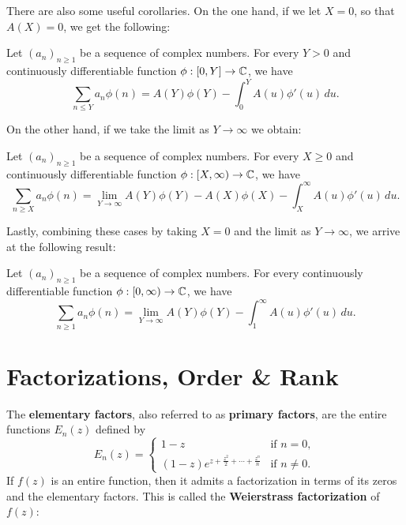     There are also some useful corollaries. On the one hand, if we let $X = 0$, so that $A(X) = 0$, we get the following:

    \begin{corollary}\label{cor:Abels_summation_formula_zero_version}
      Let $(a_{n})_{n \ge 1}$ be a sequence of complex numbers. For every $Y > 0$ and continuously differentiable function $\phi:[0,Y] \to \mathbb{C}$, we have
      \[
        \sum_{n \le Y}a_{n}\phi(n) = A(Y)\phi(Y)-\int_{0}^{Y}A(u)\phi'(u)\,du.
      \]
    \end{corollary}
    
    On the other hand, if we take the limit as $Y \to \infty$ we obtain:

    \begin{corollary}\label{cor:Abels_summation_formula_limit_version}
      Let $(a_{n})_{n \ge 1}$ be a sequence of complex numbers. For every $X \ge 0$ and continuously differentiable function $\phi:[X,\infty) \to \mathbb{C}$, we have
      \[
        \sum_{n \ge X}a_{n}\phi(n) = \lim_{Y \to \infty}A(Y)\phi(Y)-A(X)\phi(X)-\int_{X}^{\infty}A(u)\phi'(u)\,du.
      \]
    \end{corollary}

    Lastly, combining these cases by taking $X = 0$ and the limit as $Y \to \infty$, we arrive at the following result:

    \begin{corollary}\label{cor:Abels_summation_formula_limit_version_specialization}
      Let $(a_{n})_{n \ge 1}$ be a sequence of complex numbers. For every continuously differentiable function $\phi:[0,\infty) \to \mathbb{C}$, we have
      \[
        \sum_{n \ge 1}a_{n}\phi(n) = \lim_{Y \to \infty}A(Y)\phi(Y)-\int_{1}^{\infty}A(u)\phi'(u)\,du.
      \]
    \end{corollary}
  \section{Factorizations, Order \& Rank}\label{append:Factorizations_and_Finite_Order}
    The \textbf{elementary factors}, also referred to as \textbf{primary factors}, are the entire functions $E_{n}(z)$ defined by
    \[
      E_{n}(z) = \begin{cases} 1-z & \text{if } n = 0, \\ (1-z)e^{z+\frac{z^{2}}{2}+\cdots+\frac{z^{n}}{n}} & \text{if } n \neq 0. \end{cases}
    \]
    If $f(z)$ is an entire function, then it admits a factorization in terms of its zeros and the elementary factors. This is called the \textbf{Weierstrass factorization} of $f(z)$:

